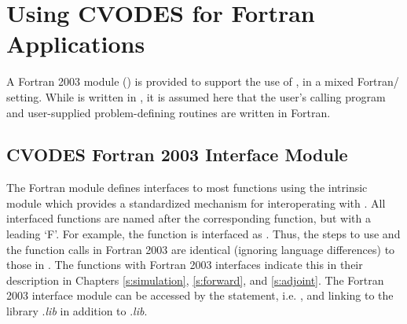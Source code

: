 \chapter{Using CVODES for Fortran Applications}\label{s:cvsfort}

A Fortran 2003 module () is provided to support the use of {\cvodes},
in a mixed Fortran/{\CC} setting. While {\cvodes} is written in {\CC}, it is assumed
here that the user's calling program and user-supplied problem-defining routines are
written in Fortran. 


\let\sectiontype\subsection
\section{CVODES Fortran 2003 Interface Module}\label{s:cvsf2003}

The  Fortran module defines interfaces to most {\cvodes} {\CC}
functions using the intrinsic  module which provides a
standardized mechanism for interoperating with {\CC}. All interfaced functions
are named after the corresponding {\CC} function, but with a leading `F'. For
example, the {\cvodes} function  is interfaced as
. Thus, the steps to use {\cvodes} and the function calls in
Fortran 2003 are identical (ignoring language differences) to those in {\CC}. The
{\CC} functions with Fortran 2003 interfaces indicate this in their description in
Chapters \ref{s:simulation}, \ref{s:forward}, and \ref{s:adjoint}. The Fortran 2003
{\cvodes} interface module can be accessed by the  statement, i.e.
, and linking to the library .{\em lib}
in addition to .{\em lib}.




